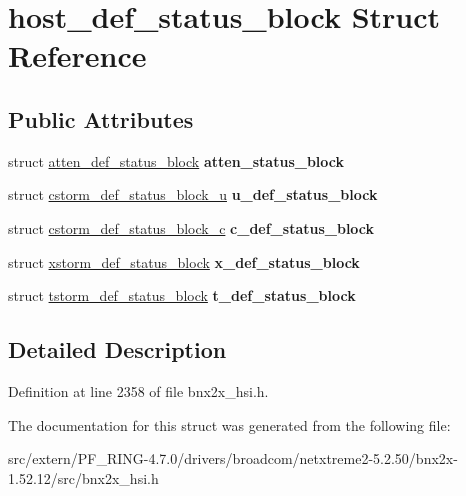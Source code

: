 \hypertarget{structhost__def__status__block}{
\section{host\_\-def\_\-status\_\-block Struct Reference}
\label{structhost__def__status__block}
}
\subsection*{Public Attributes}
\begin{DoxyCompactItemize}
\item 
\hypertarget{structhost__def__status__block_a058999776a6be96eb06c9ab7f2491721}{
struct \hyperlink{structatten__def__status__block}{atten\_\-def\_\-status\_\-block} {\bfseries atten\_\-status\_\-block}}
\label{structhost__def__status__block_a058999776a6be96eb06c9ab7f2491721}

\item 
\hypertarget{structhost__def__status__block_a26512f6280abec57f8764652f7daf9f3}{
struct \hyperlink{structcstorm__def__status__block__u}{cstorm\_\-def\_\-status\_\-block\_\-u} {\bfseries u\_\-def\_\-status\_\-block}}
\label{structhost__def__status__block_a26512f6280abec57f8764652f7daf9f3}

\item 
\hypertarget{structhost__def__status__block_a957628345b3e320afe084b79424226db}{
struct \hyperlink{structcstorm__def__status__block__c}{cstorm\_\-def\_\-status\_\-block\_\-c} {\bfseries c\_\-def\_\-status\_\-block}}
\label{structhost__def__status__block_a957628345b3e320afe084b79424226db}

\item 
\hypertarget{structhost__def__status__block_a9d47fcda9c2f50172213a030fad22b37}{
struct \hyperlink{structxstorm__def__status__block}{xstorm\_\-def\_\-status\_\-block} {\bfseries x\_\-def\_\-status\_\-block}}
\label{structhost__def__status__block_a9d47fcda9c2f50172213a030fad22b37}

\item 
\hypertarget{structhost__def__status__block_aee9502a33bc2b863953cb235515f1c2e}{
struct \hyperlink{structtstorm__def__status__block}{tstorm\_\-def\_\-status\_\-block} {\bfseries t\_\-def\_\-status\_\-block}}
\label{structhost__def__status__block_aee9502a33bc2b863953cb235515f1c2e}

\end{DoxyCompactItemize}


\subsection{Detailed Description}


Definition at line 2358 of file bnx2x\_\-hsi.h.



The documentation for this struct was generated from the following file:\begin{DoxyCompactItemize}
\item 
src/extern/PF\_\-RING-\/4.7.0/drivers/broadcom/netxtreme2-\/5.2.50/bnx2x-\/1.52.12/src/bnx2x\_\-hsi.h\end{DoxyCompactItemize}
